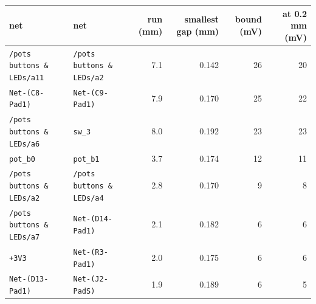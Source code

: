 \begin{tabular}{llrrrr}
\toprule
net & net & run (mm) & smallest gap (mm) & bound (mV) & at 0.2 mm (mV) \\
\midrule
\texttt{/pots buttons \& LEDs/a11} & \texttt{/pots buttons \& LEDs/a2} & 7.1 & 0.142 & 26 & 20 \\
\texttt{Net-(C8-Pad1)} & \texttt{Net-(C9-Pad1)} & 7.9 & 0.170 & 25 & 22 \\
\texttt{/pots buttons \& LEDs/a6} & \texttt{sw\_3} & 8.0 & 0.192 & 23 & 23 \\
\texttt{pot\_b0} & \texttt{pot\_b1} & 3.7 & 0.174 & 12 & 11 \\
\texttt{/pots buttons \& LEDs/a2} & \texttt{/pots buttons \& LEDs/a4} & 2.8 & 0.170 & 9 & 8 \\
\texttt{/pots buttons \& LEDs/a7} & \texttt{Net-(D14-Pad1)} & 2.1 & 0.182 & 6 & 6 \\
\texttt{+3V3} & \texttt{Net-(R3-Pad1)} & 2.0 & 0.175 & 6 & 6 \\
\texttt{Net-(D13-Pad1)} & \texttt{Net-(J2-PadS)} & 1.9 & 0.189 & 6 & 5 \\
\bottomrule
\end{tabular}
